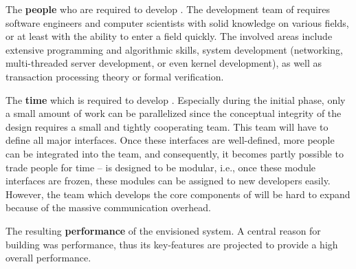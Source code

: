\documentclass[a4paper, 10pt]{book}
\begin{document}
                                        \begin{description}
                                            \item The \textbf{people} who are required to develop \SYNEIGHT. The
                                                development team of \SYNEIGHT requires software engineers and computer
                                                scientists with solid knowledge on various fields, or at least with
                                                the ability to enter a field quickly. The involved areas include
                                                extensive programming and algorithmic skills, system development
                                                (networking, multi-threaded server development, or even kernel
                                                development), as well as transaction processing theory or formal
                                                verification.
                                            \item The \textbf{time} which is required to develop \SYNEIGHT. Especially
                                                during the initial phase, only a small amount of work can be
                                                parallelized since the conceptual integrity of the design requires a
                                                small and tightly cooperating team. This team will have to define
                                                all major interfaces. Once these interfaces are well-defined, more
                                                people can be integrated into the team, and consequently, it becomes
                                                partly possible to trade people for time -- \SYNEIGHT is designed to be
                                                modular, i.e., once these module interfaces are frozen, these
                                                modules can be assigned to new developers easily. However, the team
                                                which develops the core components of \SYNEIGHT will be hard to expand
                                                because of the massive communication overhead.
                                            \item The resulting \textbf{performance} of the envisioned system. A
                                                central reason for building \SYNEIGHT was performance, thus its
                                                key-features are projected to provide a high overall performance. 

\end{description}
\end{document}
